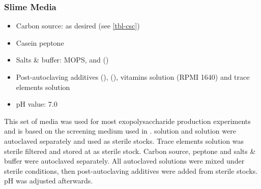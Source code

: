\subsubsection{Slime Media\label{subsec-slime-media}}
\begin{itemize}
	\item Carbon source: as desired (see \vref{tbl-csc})
	\item {} Casein peptone
	\item Salts \& buffer:
		 MOPS, 
		  and
		  ()
	\item Post-autoclaving additives
		  (), 
		  (), 
		 vitamins solution (RPMI 1640) and
		 trace elements solution
	\item pH value: \num{7.0}
\end{itemize}

This set of media was used for most exopolysaccharide production experiments and is based on the screening medium used in \cite{Ruehmann2015a}.  solution and  solution were autoclaved separately and used as sterile stocks. Trace elements solution was sterile filtered and stored at  as sterile stock. Carbon source, peptone and salts \& buffer were autoclaved separately. All autoclaved solutions were mixed under sterile conditions, then post-autoclaving additives were added from sterile stocks. pH was adjusted afterwards.


